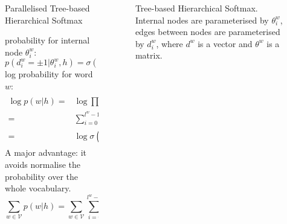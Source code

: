 \documentclass[final,t,unknownkeysallowed]{beamer}
\begin{document}
\begin{frame}{}
\begin{columns}[t]
\begin{column}{.3\linewidth}
      \begin{block}{Parallelised Tree-based Hierarchical Softmax}
      
	probability for internal node $\theta_i^w$:
	\begin{equation}
    p(d^w_i=\pm 1|\theta_{i}^w,h) = \sigma({d_i^w}\theta_{i}^w h)
    \end{equation}
    log probability for word $w$:
    \begin{equation}\label{equ:pw}
\begin{split}
 \log p(w|h)=&\log\prod_{i=0}^{l^w-1} p(d^w_i|\theta_{i}^w,h) \\
  =& \sum_{i=0}^{l^w -1} \log\sigma(d_i^w \theta_{i}^w h)\\
  =&\log\sigma({d^w}^\top \theta^w h)
 \end{split}
\end{equation}
A major advantage: it avoids normalise the probability over the whole vocabulary.
\begin{equation}
\sum_{w\in \mathcal{V}}{p(w|h)}=\sum_{w \in \mathcal{V}}\sum_{i=0}^{l^w-1}{\sigma(d_i^w\theta_{i}^w h)}=1.
\end{equation}
    
    \end{block}
    \end{column}


    \begin{column}{.3\linewidth}
    
    \begin{figure}
      \caption{Tree-based Hierarchical Softmax. Internal nodes are parameterised by $\theta_i^w$, edges between nodes are parameterised by $d_i^w$, where $d^w$ is a vector and $\theta^w$ is a matrix.}
      \end{figure}



\end{column}
\end{columns}
\end{frame}
\end{document}
